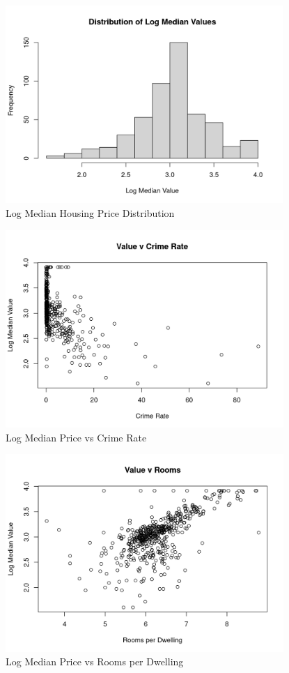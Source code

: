 \documentclass[11pt]{article}
\begin{document}
\begin{figure}[h!] 
  \centering
  \includegraphics[height=75mm]{price_dist.png}
  \caption{Log Median Housing Price Distribution}
  \label{fig:price_dist}
\end{figure}


\begin{figure}[h!] 
  \centering
  \includegraphics[height=75mm]{crime.png}
  \caption{Log Median Price vs Crime Rate}
  \label{fig:crime}
\end{figure}

\begin{figure}[h!] 
  \centering
  \includegraphics[height=75mm]{rooms.png}
  \caption{Log Median Price vs Rooms per Dwelling}
  \label{fig:rooms}
\end{figure}
\end{document}
